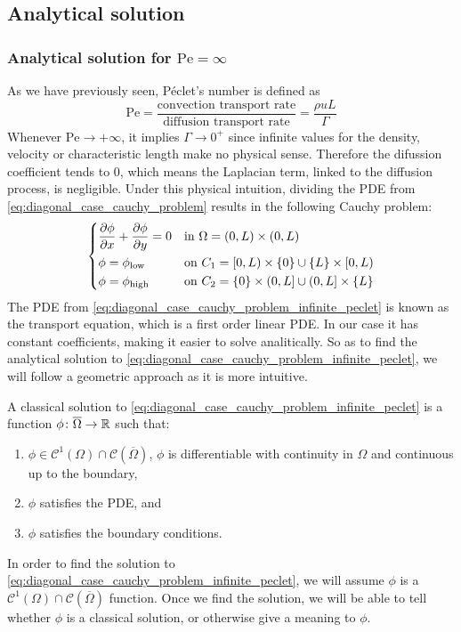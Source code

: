 
\subsection{Analytical solution}

\subsubsection{Analytical solution for \texorpdfstring{$\mathrm{Pe} = \infty$}{infinite Péclet's number}}

As we have previously seen, Péclet's number is defined as
\begin{equation}
	\mathrm{Pe} = 
	\frac{\text{convection transport rate}}{\text{diffusion transport rate}} = 
	\frac{\rho u L}{\Gamma}
\end{equation}
Whenever $\mathrm{Pe} \to +\infty$, it implies $\Gamma \to 0^+$ since infinite values for the density, velocity or characteristic length make no physical sense. Therefore the difussion coefficient tends to $0$, which means the Laplacian term, linked to the diffusion process, is negligible. Under this physical intuition, dividing the PDE from \eqref{eq:diagonal_case_cauchy_problem} results in the following Cauchy problem:
\begin{equation} \label{eq:diagonal_case_cauchy_problem_infinite_peclet}
	\left\{
	\begin{aligned}
		&\pdv{\phi}{x} + \pdv{\phi}{y} = 0 &
		&\text{in } \Omega = (0,L) \times (0,L) \\
		&\phi = \phi_\text{low} &
		&\text{on } C_1 = [0,L) \times \{ 0 \} \cup \{ L \} \times [0,L) \\
		&\phi = \phi_\text{high} &
		&\text{on } C_2 = \{ 0 \} \times (0,L] \cup (0,L] \times \{ L \}
	\end{aligned}
	\right.
\end{equation}
The PDE from \eqref{eq:diagonal_case_cauchy_problem_infinite_peclet} is known as the transport equation, which is a first order linear PDE. In our case it has constant coefficients, making it easier to solve analitically. So as to find the analytical solution to \eqref{eq:diagonal_case_cauchy_problem_infinite_peclet}, we will follow a geometric approach as it is more intuitive. 

A classical solution to \eqref{eq:diagonal_case_cauchy_problem_infinite_peclet} is a function $\phi \colon \overline{\Omega} \rightarrow \mathbb{R}$ such that:
\begin{enumerate}[label={(\roman*)}, topsep=0pt]
	\item $\phi \in \mathcal{C}^1(\Omega) \cap \mathcal{C}(\overline{\Omega})$, \ie $\phi$ is differentiable with continuity in $\Omega$ and continuous up to the boundary,
	\item $\phi$ satisfies the PDE, and
	\item $\phi$ satisfies the boundary conditions.
\end{enumerate}
In order to find the solution to \eqref{eq:diagonal_case_cauchy_problem_infinite_peclet}, we will assume $\phi$ is a $\mathcal{C}^1(\Omega) \cap \mathcal{C}(\overline{\Omega})$ function. Once we find the solution, we will be able to tell whether $\phi$ is a classical solution, or otherwise give a meaning to $\phi$.

